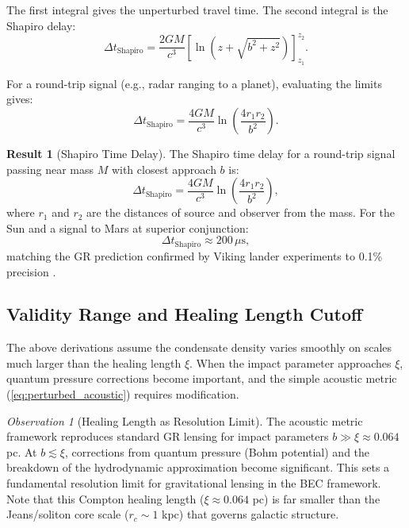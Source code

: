 \documentclass[11pt,a4paper]{article}
\theoremstyle{definition}
\newtheorem{result}{Result}[section]
\theoremstyle{remark}
\newtheorem{observation}{Observation}[section]
\begin{document}
The first integral gives the unperturbed travel time. The second integral is the Shapiro delay:
\begin{equation}
\Delta t_{\mathrm{Shapiro}} = \frac{2GM}{c^3} \left[\ln\left(z + \sqrt{b^2 + z^2}\right)\right]_{z_1}^{z_2}.
\end{equation}

For a round-trip signal (e.g., radar ranging to a planet), evaluating the limits gives:
\begin{equation}
\Delta t_{\mathrm{Shapiro}} = \frac{4GM}{c^3} \ln\left(\frac{4r_1 r_2}{b^2}\right).
\end{equation}

\begin{result}[Shapiro Time Delay]
\label{res:shapiro_delay}
The Shapiro time delay for a round-trip signal passing near mass $M$ with closest approach $b$ is:
\begin{equation}
\boxed{\Delta t_{\mathrm{Shapiro}} = \frac{4GM}{c^3} \ln\left(\frac{4r_1 r_2}{b^2}\right),}
\end{equation}
where $r_1$ and $r_2$ are the distances of source and observer from the mass. For the Sun and a signal to Mars at superior conjunction:
\begin{equation}
\Delta t_{\mathrm{Shapiro}} \approx 200 \, \mu\text{s},
\end{equation}
matching the GR prediction confirmed by Viking lander experiments to 0.1\% precision \cite{Reasenberg1979}.
\end{result}

\subsection{Validity Range and Healing Length Cutoff}
\label{sec:validity_range}

The above derivations assume the condensate density varies smoothly on scales much larger than the healing length $\xi$. When the impact parameter approaches $\xi$, quantum pressure corrections become important, and the simple acoustic metric (\ref{eq:perturbed_acoustic}) requires modification.

\begin{observation}[Healing Length as Resolution Limit]
The acoustic metric framework reproduces standard GR lensing for impact parameters $b \gg \xi \approx 0.064$ pc. At $b \lesssim \xi$, corrections from quantum pressure (Bohm potential) and the breakdown of the hydrodynamic approximation become significant. This sets a fundamental resolution limit for gravitational lensing in the BEC framework. Note that this Compton healing length ($\xi \approx 0.064$ pc) is far smaller than the Jeans/soliton core scale ($r_c \sim 1$ kpc) that governs galactic structure.
\end{observation}
\end{document}
